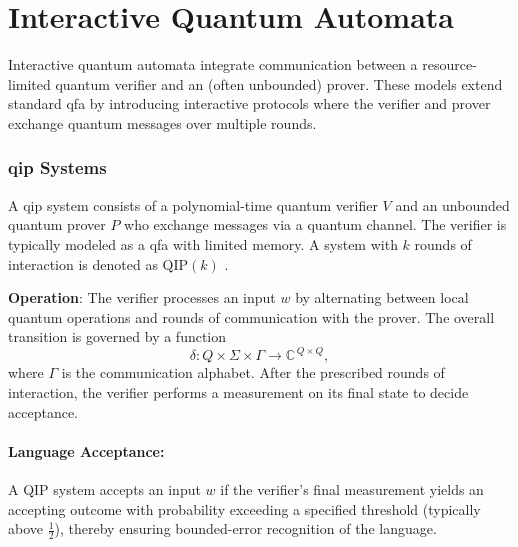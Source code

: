 \section{Interactive Quantum Automata}
\label{sec:interactive-quantum}

Interactive quantum automata integrate communication between a resource-limited quantum verifier and an (often unbounded) prover. These models extend standard \gls{qfa} by introducing interactive protocols where the verifier and prover exchange quantum messages over multiple rounds.

\subsubsection{\gls{qip} Systems}
\label{sssec:qip}
\begin{definition}
A \gls{qip} system consists of a polynomial-time quantum verifier \( V \) and an unbounded quantum prover \( P \) who exchange messages via a quantum channel. The verifier is typically modeled as a \gls{qfa} with limited memory. A system with \( k \) rounds of interaction is denoted as \(\text{QIP}(k)\) \cite{nishimura2009application, zheng2015power}.
\end{definition}

\textbf{Operation}:  
The verifier processes an input \( w \) by alternating between local quantum operations and rounds of communication with the prover. The overall transition is governed by a function
\[
\delta: Q \times \Sigma \times \Gamma \to \mathbb{C}^{\, Q \times Q},
\]
where \( \Gamma \) is the communication alphabet. After the prescribed rounds of interaction, the verifier performs a measurement on its final state to decide acceptance.

\paragraph{Language Acceptance:}  
A QIP system accepts an input \( w \) if the verifier’s final measurement yields an accepting outcome with probability exceeding a specified threshold (typically above \( \frac{1}{2} \)), thereby ensuring bounded-error recognition of the language.

